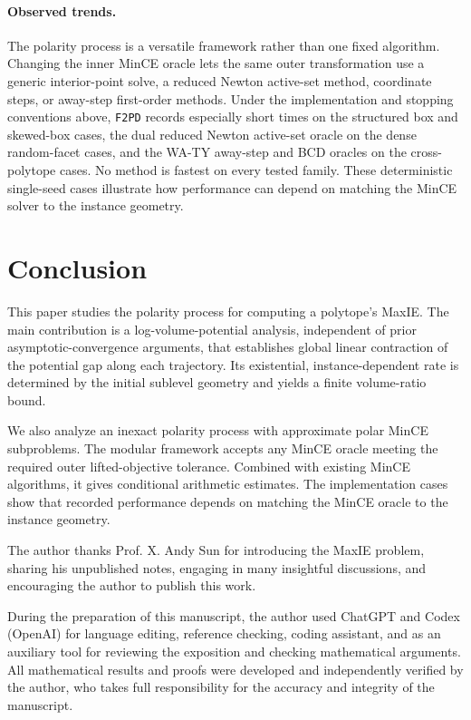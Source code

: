 \documentclass[smallextended]{svjour3}
\begin{document}
\paragraph{Observed trends.}
The polarity process is a versatile framework rather than one fixed algorithm.
Changing the inner MinCE oracle lets the
same outer transformation use a generic interior-point solve, a reduced
Newton active-set method, coordinate steps, or away-step first-order methods.
Under the implementation and stopping conventions above, \texttt{F2PD} records
especially short times on the structured box and skewed-box cases, the dual
reduced Newton active-set oracle on the dense random-facet cases, and the WA-TY
away-step and BCD oracles on the cross-polytope cases. No method is fastest
on every tested family. These deterministic single-seed cases
illustrate how performance can depend on matching the MinCE solver to the
instance geometry.


\section{Conclusion} \label{sec:conclusion}
This paper studies the polarity process for computing a polytope's MaxIE. The
main contribution is a log-volume-potential analysis, independent of prior
asymptotic-convergence
arguments, that establishes global linear contraction of the potential gap along each trajectory.
Its existential, instance-dependent rate is determined by the initial sublevel
geometry and yields a finite volume-ratio bound.

We also analyze an inexact polarity process with approximate polar MinCE
subproblems. The modular framework accepts any MinCE oracle meeting the
required outer lifted-objective tolerance. Combined with existing MinCE
algorithms, it gives conditional arithmetic estimates. The implementation cases
show that recorded performance depends on matching the MinCE oracle to the
instance geometry.

\enlargethispage{3\baselineskip}
\begin{acknowledgements}
The author thanks Prof. X. Andy Sun for introducing the MaxIE problem, sharing his unpublished notes,
engaging in many insightful discussions, and encouraging the author to publish this work. 

During the preparation of this manuscript, the author used ChatGPT and Codex (OpenAI) for 
language editing, reference checking, coding assistant, and as an auxiliary tool for reviewing the exposition and checking mathematical arguments. All mathematical results and proofs were developed and independently verified by the author, who takes full responsibility for the accuracy and integrity of the manuscript.
\end{acknowledgements}


\begingroup
\linespread{0.986}\selectfont


\endgroup
\end{document}
